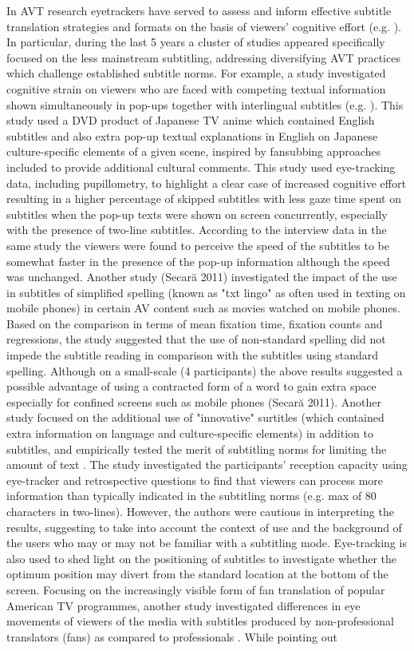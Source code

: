 \documentclass[output=paper]{langsci/langscibook}
\begin{document}
In AVT research eyetrackers have served to assess and inform effective subtitle translation strategies and formats on the basis of viewers' cognitive effort (e.g. \citet{ghia2012}). In particular, during the last 5 years a cluster of studies appeared specifically focused on the less mainstream subtitling, addressing diversifying AVT practices which challenge established subtitle norms. For example, a study investigated cognitive strain on viewers who are faced with competing textual information shown simultaneously in pop-ups together with interlingual subtitles (e.g. \citet{caffrey2009}). This study used a DVD product of Japanese TV anime which contained English subtitles and also extra pop-up textual explanations in English on Japanese culture-specific elements of a given scene, inspired by fansubbing approaches included to provide additional cultural comments.  This study used eye-tracking data, including pupillometry, to highlight a clear case of increased cognitive effort resulting in a higher percentage of skipped subtitles with less gaze time spent on subtitles when the pop-up texts were shown on screen concurrently, especially with the presence of two-line subtitles. According to the interview data in the same study the viewers were found to perceive the speed of the subtitles to be somewhat faster in the presence of the pop-up information although the speed was unchanged. Another study (Secar\u{a} 2011) investigated the impact of the use in subtitles of simplified spelling (known as "txt lingo" as often used in texting on mobile phones) in certain AV content such as movies watched on mobile phones. Based on the comparison in terms of mean fixation time, fixation counts and regressions, the study suggested that the use of non-standard spelling did not impede the subtitle reading in comparison with the subtitles using standard spelling. Although on a small-scale (4 participants) the above results suggested a possible advantage of using a contracted form of a word to gain extra space especially for confined screens such as mobile phones (Secar\u{a} 2011). Another study focused on the additional use of "innovative" surtitles (which contained extra information on language and culture-specific elements) in addition to subtitles, and empirically tested the merit of subtitling norms for limiting the amount of text \citep{Künzli2011}. The study investigated the participants' reception capacity using eye-tracker and retrospective questions to find that viewers can process more information than typically indicated in the subtitling norms (e.g. max of 80 characters in two-lines). However, the authors were cautious in interpreting the results, suggesting to take into account the context of use and the background of the users who may or may not be familiar with a subtitling mode.  Eye-tracking is also used to shed light on the positioning of subtitles \citep{Fox2013} to investigate whether the optimum position may divert from the standard location at the bottom of the screen. Focusing on the increasingly visible form of fan translation of popular American TV programmes, another study investigated differences in eye movements of viewers of the media with subtitles produced by non-professional translators (fans) as compared to professionals \citep{orrego2014}. While pointing out 
\end{document}
